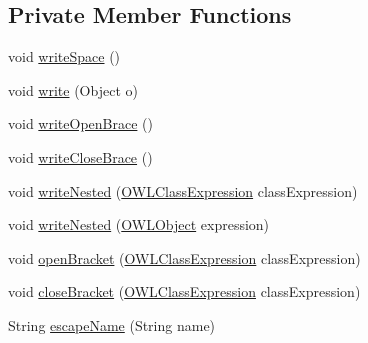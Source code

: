 \subsection*{Private Member Functions}
\begin{DoxyCompactItemize}
\item 
void \hyperlink{classorg_1_1coode_1_1owlapi_1_1latex_1_1_latex_object_visitor_aa5ca6f97636eea4cc9ffcf8b7e5b88c5}{write\-Space} ()
\item 
void \hyperlink{classorg_1_1coode_1_1owlapi_1_1latex_1_1_latex_object_visitor_a37954684ae3fbd9cf3d72a385cb06090}{write} (Object o)
\item 
void \hyperlink{classorg_1_1coode_1_1owlapi_1_1latex_1_1_latex_object_visitor_ae686a781d22185672aafbee233d8c4ca}{write\-Open\-Brace} ()
\item 
void \hyperlink{classorg_1_1coode_1_1owlapi_1_1latex_1_1_latex_object_visitor_ab84bb8d0d067dbd3097788b4e780341d}{write\-Close\-Brace} ()
\item 
void \hyperlink{classorg_1_1coode_1_1owlapi_1_1latex_1_1_latex_object_visitor_a176cdd929602ebee18aefeebacea53aa}{write\-Nested} (\hyperlink{interfaceorg_1_1semanticweb_1_1owlapi_1_1model_1_1_o_w_l_class_expression}{O\-W\-L\-Class\-Expression} class\-Expression)
\item 
void \hyperlink{classorg_1_1coode_1_1owlapi_1_1latex_1_1_latex_object_visitor_a61d30c89783ef54384314b9c770f4af6}{write\-Nested} (\hyperlink{interfaceorg_1_1semanticweb_1_1owlapi_1_1model_1_1_o_w_l_object}{O\-W\-L\-Object} expression)
\item 
void \hyperlink{classorg_1_1coode_1_1owlapi_1_1latex_1_1_latex_object_visitor_a82f2ac8addffccdeefc3cd6ec349dfa3}{open\-Bracket} (\hyperlink{interfaceorg_1_1semanticweb_1_1owlapi_1_1model_1_1_o_w_l_class_expression}{O\-W\-L\-Class\-Expression} class\-Expression)
\item 
void \hyperlink{classorg_1_1coode_1_1owlapi_1_1latex_1_1_latex_object_visitor_ab7b885c5c9c683d405a1d1bda1e61374}{close\-Bracket} (\hyperlink{interfaceorg_1_1semanticweb_1_1owlapi_1_1model_1_1_o_w_l_class_expression}{O\-W\-L\-Class\-Expression} class\-Expression)
\item 
String \hyperlink{classorg_1_1coode_1_1owlapi_1_1latex_1_1_latex_object_visitor_ad574397a7518f79b399799d4c19a913d}{escape\-Name} (String name)
\end{DoxyCompactItemize}
